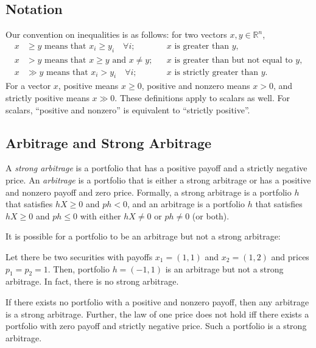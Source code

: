 \documentclass[\topdir/lecture\_notes.tex]{subfiles}
\begin{document}
\subsection{Notation}
Our convention on inequalities is as follows: for two vectors $x, y \in \mathbb{R}^{n}$,
\begin{align*}
x & \geq y \text{ means that } x_{i} \geq y_{i} \quad \forall i;&& x \text{ is greater than } y, \\
x & > y \text{ means that } x \geq y \text{ and } x \neq y;&& x \text{ is greater than but not equal to } y, \\
x & \gg y \text{ means that } x_{i}>y_{i} \quad \forall i;&& x \text{ is strictly greater than } y.
\end{align*}
For a vector $x$, positive means $x \geq 0$, positive and nonzero means $x>0$, and strictly positive means $x \gg 0$. These definitions apply to scalars as well. For scalars, ``positive and nonzero'' is equivalent to ``strictly positive''.

\subsection{Arbitrage and Strong Arbitrage}
A \emph{strong arbitrage} is a portfolio that has a positive payoff and a strictly negative price. An \emph{arbitrage} is a portfolio that is either a strong arbitrage or has a positive and nonzero payoff and zero price. Formally, a strong arbitrage is a portfolio $h$ that satisfies $h X \geq 0$ and $p h<0$, and an arbitrage is a portfolio $h$ that satisfies $h X \geq 0$ and $p h \leq 0$ with either $h X \neq 0$ or $p h \neq 0$ (or both).

It is possible for a portfolio to be an arbitrage but not a strong arbitrage:

\begin{example}\label{ex:arbitrage_not_strong}
Let there be two securities with payoffs $x_{1}=(1,1)$ and $x_{2}=(1,2)$ and prices $p_{1}=p_{2}=1$. Then, portfolio $h=(-1,1)$ is an arbitrage but not a strong arbitrage. In fact, there is no strong arbitrage.
\end{example}

If there exists no portfolio with a positive and nonzero payoff, then any arbitrage is a strong arbitrage. Further, the law of one price does not hold iff there exists a portfolio with zero payoff and strictly negative price. Such a portfolio is a strong arbitrage.
\end{document}
